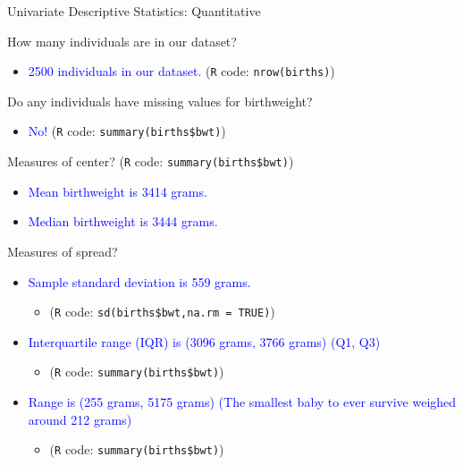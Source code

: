 \documentclass[10pt,t]{beamer}
\begin{document}
\begin{frame}{Univariate Descriptive Statistics: Quantitative}

\vspace{-5 mm}

How many individuals are in our dataset?

\begin{itemize}
	\item[] \textcolor{blue}{2500 individuals in our dataset.} (\texttt{R} code: \texttt{nrow(births)})
\end{itemize}

Do any individuals have missing values for birthweight?

\begin{itemize}
	\item[] \textcolor{blue}{No!} (\texttt{R} code: \texttt{summary(births\$bwt)})
\end{itemize}

Measures of center? (\texttt{R} code: \texttt{summary(births\$bwt)})

\begin{itemize}
	\item[] \textcolor{blue}{Mean birthweight is 3414 grams.}
	\item[] \textcolor{blue}{Median birthweight is 3444 grams.}
\end{itemize}

Measures of spread?

\begin{itemize}
	\item[] \textcolor{blue}{Sample standard deviation is 559 grams.} 
	\begin{itemize}
	\item[] (\texttt{R} code: \texttt{sd(births\$bwt,na.rm = TRUE)})
	\end{itemize}
	\item[] \textcolor{blue}{Interquartile range (IQR) is (3096 grams, 3766 grams) (Q1, Q3)}
	\begin{itemize}
		\item[] (\texttt{R} code: \texttt{summary(births\$bwt)})
	\end{itemize}
	\item[] \textcolor{blue}{Range is (255 grams, 5175 grams) (The smallest baby to ever survive weighed around 212 grams)}
	\begin{itemize}
		\item[] (\texttt{R} code: \texttt{summary(births\$bwt)})
	\end{itemize}
\end{itemize}


\end{frame}
	
\end{document}
